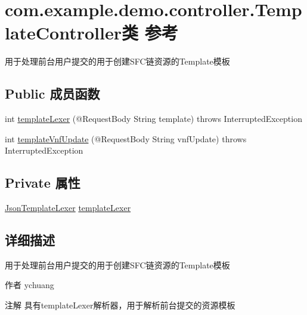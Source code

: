 \hypertarget{classcom_1_1example_1_1demo_1_1controller_1_1_template_controller}{}\section{com.\+example.\+demo.\+controller.\+Template\+Controller类 参考}
\label{classcom_1_1example_1_1demo_1_1controller_1_1_template_controller}


用于处理前台用户提交的用于创建\+S\+F\+C链资源的\+Template模板  


\subsection*{Public 成员函数}
\begin{DoxyCompactItemize}
\item 
int \mbox{\hyperlink{classcom_1_1example_1_1demo_1_1controller_1_1_template_controller_ae134c853f3d9422c8fb79cb2460d1742}{template\+Lexer}} (@Request\+Body String template)  throws Interrupted\+Exception
\item 
int \mbox{\hyperlink{classcom_1_1example_1_1demo_1_1controller_1_1_template_controller_a5b2e16c0f3506c6a4b21f7cbb36c899b}{template\+Vnf\+Update}} (@Request\+Body String vnf\+Update)  throws Interrupted\+Exception
\end{DoxyCompactItemize}
\subsection*{Private 属性}
\begin{DoxyCompactItemize}
\item 
\mbox{\hyperlink{classcom_1_1example_1_1demo_1_1templates_1_1_json_template_lexer}{Json\+Template\+Lexer}} \mbox{\hyperlink{classcom_1_1example_1_1demo_1_1controller_1_1_template_controller_a3eec265b5ae5f560a034936fe8c4c6e7}{template\+Lexer}}
\end{DoxyCompactItemize}


\subsection{详细描述}
用于处理前台用户提交的用于创建\+S\+F\+C链资源的\+Template模板 

\begin{DoxyAuthor}{作者}
ychuang 
\end{DoxyAuthor}
\begin{DoxyNote}{注解}
具有template\+Lexer解析器，用于解析前台提交的资源模板 
\end{DoxyNote}


